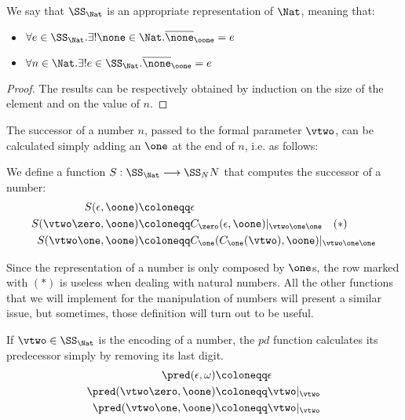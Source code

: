 \begin{remark}
We say that $\SS_\Nat$ is an appropriate representation of $\Nat$, meaning that:
\begin{itemize}
\item $\forall e \in \SS_\Nat. \exists! \none \in \Nat. \overline \none_\oone = e$
\item $\forall n \in \Nat. \exists! e \in \SS_\Nat. \overline \none_\oone = e$
\end{itemize}
\end{remark}

\begin{proof}
The results can be respectively obtained by induction on the size of the element and on the value of $n$.
\end{proof}


The successor of a number $n$, passed to the formal parameter $\vtwo$, can be calculated simply adding an $\one$ at the end of $n$, i.e. as follows:

\begin{defn}
We define a function $S: \SS_\Nat \longrightarrow \SS_NN$ that computes the successor of a number:
\begin{align*}
S(\epsilon, \oone) &\coloneqq \epsilon\\
S(\vtwo\zero, \oone)&\coloneqq  C_\zero(\epsilon, \oone)|_{\vtwo\one\one}\quad(*)\\
S(\vtwo\one, \oone)&\coloneqq C_\one(C_\one(\vtwo), \oone)|_{\vtwo\one\one}\\
\end{align*}
\end{defn}

Since the representation of a number is only composed by $\one$s, the row marked with $(*)$ is useless when dealing with natural numbers. All the other functions that we will implement for the manipulation of numbers will present a similar issue, but sometimes, those definition will turn out to be useful.


\begin{defn}
If $\vtwo\in \SS_\Nat$ is the encoding of a number, the $pd$ function calculates its predecessor simply by removing its last digit.
\begin{align*}
\pred(\epsilon, \omega) &\coloneqq \epsilon\\
\pred(\vtwo \zero, \oone) &\coloneqq \vtwo|_{\vtwo}\\
\pred(\vtwo \one, \oone) &\coloneqq \vtwo|_{\vtwo}\\
\end{align*}
\end{defn}

